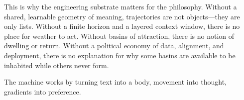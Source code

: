\documentclass[12pt,a4paper]{article}
\begin{document}
This is why the engineering substrate matters for the philosophy. Without a shared, learnable geometry of meaning, trajectories are not objects---they are only lists. Without a finite horizon and a layered context window, there is no place for weather to act. Without basins of attraction, there is no notion of dwelling or return. Without a political economy of data, alignment, and deployment, there is no explanation for why some basins are available to be inhabited while others never form.

The machine works by turning text into a body, movement into thought, gradients into preference.



\end{document}
